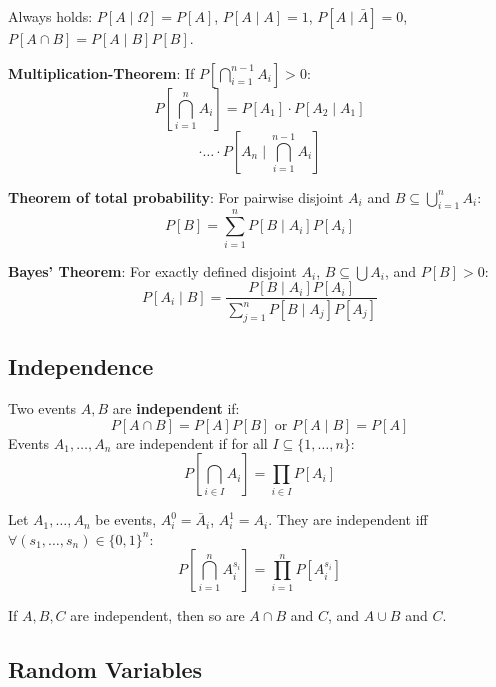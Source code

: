\begin{remark}
	Always holds: $P[A \mid \Omega] = P[A]$, $P[A \mid A] = 1$, $P[A \mid \bar{A}] = 0$, $P[A \cap B] = P[A \mid B] P[B]$.
\end{remark}

\begin{theorem}
	\textbf{Multiplication-Theorem}: If $P[\bigcap_{i=1}^{n-1} A_i] > 0$:
	$$P[\bigcap_{i=1}^n A_i] = P[A_1] \cdot P[A_2 \mid A_1]$$
	$$\cdot \dots \cdot P[A_n \mid \bigcap_{i=1}^{n-1} A_i]$$
\end{theorem}

\begin{theorem}
	\textbf{Theorem of total probability}: For pairwise disjoint $A_i$ and $B \subseteq \bigcup_{i=1}^n A_i$:
	$$P[B] = \sum_{i=1}^n P[B \mid A_i] P[A_i]$$
\end{theorem}

\begin{theorem}
	\textbf{Bayes' Theorem}: For exactly defined disjoint $A_i$, $B \subseteq \bigcup A_i$, and $P[B] > 0$:
	$$P[A_i \mid B] = \frac{P[B \mid A_i] P[A_i]}{\sum_{j=1}^n P[B \mid A_j] P[A_j]}$$
\end{theorem}

\subsection{Independence}

\begin{definition}
	Two events $A, B$ are \textbf{independent} if:
	$$P[A \cap B] = P[A] P[B] \text{ or } P[A \mid B] = P[A]$$
	Events $A_1, \dots, A_n$ are independent if for all $I \subseteq \{1, \dots, n\}$:
	$$P[\bigcap_{i \in I} A_i] = \prod_{i \in I} P[A_i]$$
\end{definition}

\begin{lemma}
	Let $A_1, \dots, A_n$ be events, $A_i^0 = \bar{A}_i$, $A_i^1 = A_i$. They are independent iff $\forall (s_1,\dots,s_n) \in \{0,1\}^n$:
	$$P[\bigcap_{i=1}^n A_i^{s_i}] = \prod_{i=1}^n P[A_i^{s_i}]$$
\end{lemma}

\begin{lemma}
	If $A, B, C$ are independent, then so are $A \cap B$ and $C$, and $A \cup B$ and $C$.
\end{lemma}

\subsection{Random Variables}

